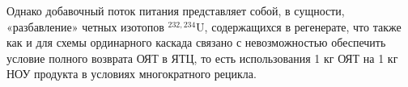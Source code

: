 Однако добавочный поток питания представляет собой, в сущности, «разбавление» четных изотопов  $^{232,234}$U, содержащихся в регенерате, что также как и для схемы ординарного каскада связано с невозможностью обеспечить условие полного возврата ОЯТ в ЯТЦ, то есть использования 1 кг ОЯТ на 1 кг НОУ продукта в условиях многократного рецикла. 




